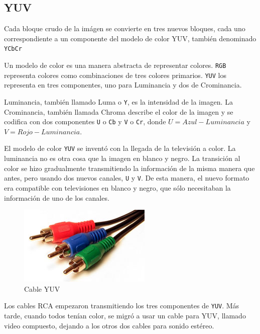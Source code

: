 \subsection{YUV}\label{sub:yuv}

Cada bloque crudo de la imágen se convierte en tres nuevos bloques, cada uno
correspondiente a un componente del modelo de color \gls{YUV}, también
denominado \verb+YCbCr+

Un modelo de color es una manera abstracta de representar colores. \verb+RGB+
representa colores como combinaciones de tres colores primarios. \verb+YUV+ los
representa en tres componentes, uno para Luminancia y dos de Crominancia.

\gls{Luminancia}, también llamado Luma o \verb+Y+, es la intensidad de la imagen. La
\gls{Crominancia}, también llamada Chroma describe el color de la imagen y se
codifica con dos componentes \verb+U+ o \verb+Cb+ y \verb+V+ o \verb+Cr+, donde
$U = Azul - Luminancia$ y $V = Rojo - Luminancia$.

El modelo de color \verb+YUV+ se inventó con la llegada de la televisión a
color. La luminancia no es otra cosa que la imagen en blanco y negro. La
transición al color se hizo gradualmente transmitiendo la información de la
misma manera que antes, pero usando dos nuevos canales, \verb+U+ y \verb+V+. De
esta manera, el nuevo formato era compatible con televisiones en blanco y
negro, que sólo necesitaban la información de uno de los canales.

\begin{figure}[hb]
\includegraphics{yuv_cable}
    \caption{Cable YUV}
\end{figure}

Los cables RCA empezaron transmitiendo los tres componentes de \verb+YUV+. Más
tarde, cuando todos tenían color, se migró a usar un cable para \gls{YUV},
llamado video compuesto, dejando a los otros dos cables para sonido estéreo.

